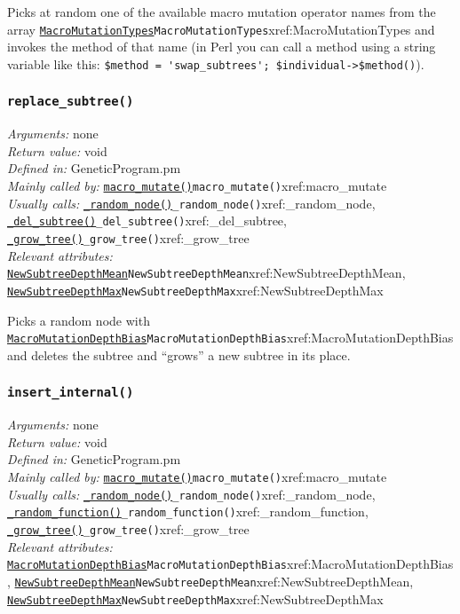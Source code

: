 \documentclass[a4paper]{article}
\begin{document}
Picks at random one of the available macro mutation operator names
from the array \hyperref[no]{\texttt{MacroMutationTypes}}{\texttt{MacroMutationTypes}}{xref:MacroMutationTypes} and invokes the method of that name (in Perl you can call a method using a string variable like this: \verb:$method = 'swap_subtrees'; $individual->$method():). %

\subsubsection{\texttt{replace\_subtree()}}\label{xref:replace_subtree}
\begin{flushleft}
\textit{Arguments:} none\\
\textit{Return value:} void\\
\textit{Defined in:} GeneticProgram.pm\\
\textit{Mainly called by:} \hyperref[no]{\texttt{macro\_mutate()}}{\texttt{macro\_mutate()}}{xref:macro_mutate}\\
\textit{Usually calls:} \hyperref[no]{\texttt{\_random\_node()}}{\texttt{\_random\_node()}}{xref:_random_node}, \hyperref[no]{\texttt{\_del\_subtree()}}{\texttt{\_del\_subtree()}}{xref:_del_subtree}, \hyperref[no]{\texttt{\_grow\_tree()}}{\texttt{\_grow\_tree()}}{xref:_grow_tree}\\
\textit{Relevant attributes:} \hyperref[no]{\texttt{NewSubtreeDepthMean}}{\texttt{NewSubtreeDepthMean}}{xref:NewSubtreeDepthMean}, \hyperref[no]{\texttt{NewSubtreeDepthMax}}{\texttt{NewSubtreeDepthMax}}{xref:NewSubtreeDepthMax}
\end{flushleft}

Picks a random node with \hyperref[no]{\texttt{MacroMutationDepthBias}}{\texttt{MacroMutationDepthBias}}{xref:MacroMutationDepthBias} and deletes
the subtree and ``grows'' a new subtree in its place.

\subsubsection{\texttt{insert\_internal()}}\label{xref:insert_internal}
\begin{flushleft}
\textit{Arguments:} none\\
\textit{Return value:} void\\
\textit{Defined in:} GeneticProgram.pm\\
\textit{Mainly called by:} \hyperref[no]{\texttt{macro\_mutate()}}{\texttt{macro\_mutate()}}{xref:macro_mutate}\\
\textit{Usually calls:} \hyperref[no]{\texttt{\_random\_node()}}{\texttt{\_random\_node()}}{xref:_random_node}, \hyperref[no]{\texttt{\_random\_function()}}{\texttt{\_random\_function()}}{xref:_random_function}, \hyperref[no]{\texttt{\_grow\_tree()}}{\texttt{\_grow\_tree()}}{xref:_grow_tree}\\
\textit{Relevant attributes:} \hyperref[no]{\texttt{MacroMutationDepthBias}}{\texttt{MacroMutationDepthBias}}{xref:MacroMutationDepthBias}, \hyperref[no]{\texttt{NewSubtreeDepthMean}}{\texttt{NewSubtreeDepthMean}}{xref:NewSubtreeDepthMean}, \hyperref[no]{\texttt{NewSubtreeDepthMax}}{\texttt{NewSubtreeDepthMax}}{xref:NewSubtreeDepthMax}
\end{flushleft}
\end{document}
